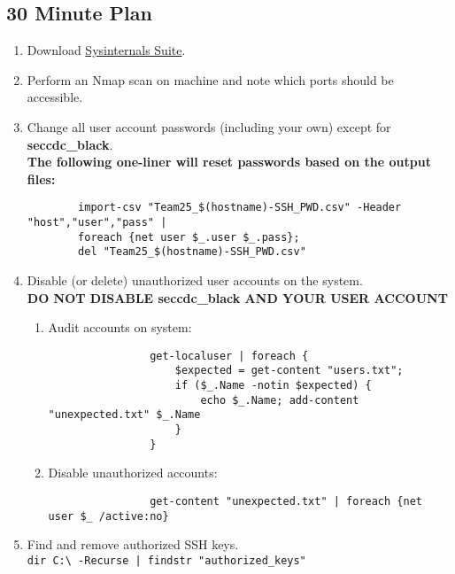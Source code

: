\documentclass[12pt,letterpaper]{article}
\def\code#1{\textcolor{iris}{\texttt{#1}}}
\def\bf#1{\textbf{#1}}
\begin{document}
\subsection{30 Minute Plan}

\begin{enumerate}
	\item Download \href{https://download.sysinternals.com/files/SysinternalsSuite.zip}{Sysinternals Suite}.
	\item Perform an Nmap scan on machine and note which ports should be accessible.
	\item Change all user account passwords (including your own) except for \bf{seccdc\_black}. \\
		\bf{The following one-liner will reset passwords based on the output files:}
		{ \color{iris} \begin{verbatim}
		import-csv "Team25_$(hostname)-SSH_PWD.csv" -Header "host","user","pass" |
		foreach {net user $_.user $_.pass};
		del "Team25_$(hostname)-SSH_PWD.csv"
		\end{verbatim} }
	\item Disable (or delete) unauthorized user accounts on the system. \\
	\bf{DO NOT DISABLE seccdc\_black AND YOUR USER ACCOUNT}
		\begin{enumerate}
			\item Audit accounts on system:
				{ \color{iris} \begin{verbatim}
				get-localuser | foreach {
					$expected = get-content "users.txt";
					if ($_.Name -notin $expected) {
						echo $_.Name; add-content "unexpected.txt" $_.Name
					}
				}
				\end{verbatim} }
			\item Disable unauthorized accounts:
				{ \color{iris} \begin{verbatim}
				get-content "unexpected.txt" | foreach {net user $_ /active:no}
				\end{verbatim} }
		\end{enumerate}
	\item Find and remove authorized SSH keys. \\
		\code{dir C:\textbackslash{} -Recurse | findstr "authorized\_keys"}


\end{enumerate}
\end{document}
